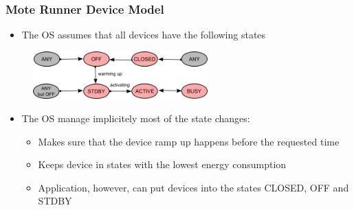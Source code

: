 \begin{frame}[fragile]
  	\frametitle{Mote Runner Device Model}
  	\begin{itemize}
  		\item The OS assumes that all devices have the following states
  	\end{itemize}
  	\begin{figure}
  		\centering
   		\includegraphics[width=0.6\textwidth]{img/sdev-states.png}
  	\end{figure}
  	\begin{itemize}
 		\item The OS manage implicitely most of the state changes:
	 	 \begin{itemize}
	  		\item Makes sure that the device ramp up happens before the requested time
			\item Keeps device in states with the lowest energy consumption
			\item Application, however, can put devices into the states CLOSED, OFF and STDBY
		\end{itemize}
	\end{itemize}
\end{frame}

